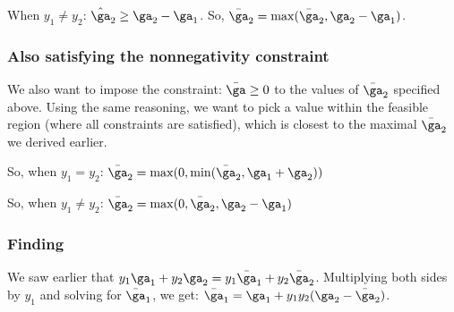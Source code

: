 \documentclass{article}
\begin{document}
When $y_{1} \neq y_{2}$: $\hat{\ga}_{2} \geq \ga_{2} - \ga_{1}$. So, $\bar{\ga}_{2} = \max(\bar{\ga}_2, \ga_{2} - \ga_{1})$.

\subsubsection{Also satisfying the nonnegativity constraint}
We also want to impose the constraint: $\bar{\ga} \geq 0$ to the values of $\bar{\ga}_{2}$ specified above. Using the same reasoning, we want to pick a value within the feasible region (where all constraints are satisfied), which is closest to the maximal $\bar{\ga}_{2}$ we derived earlier.

So, when $y_{1} = y_{2}$: $\bar{\ga}_2 = \max(0, \min(\bar{\ga}_2, \ga_{1} + \ga_{2}))$

So, when $y_{1} \neq y_{2}$: $\bar{\ga}_2 = \max(0, \bar{\ga}_2, \ga_{2} - \ga_{1})$

\subsubsection{Finding }
We saw earlier that $y_{1}\ga_{1} +  y_{2}\ga_{2} = y_{1}\bar{\ga}_{1} +  y_{2}\bar{\ga}_{2}$. Multiplying both sides by $y_{1}$ and solving for $\bar{\ga}_{1}$, we get: $\bar{\ga}_{1} = \ga_{1} + y_{1}y_{2}(\ga_{2} - \bar{\ga}_2)$.

% 
% 
\end{document}
